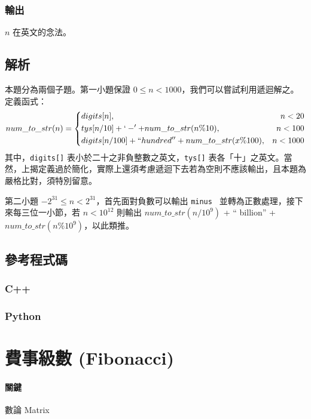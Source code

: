 \documentclass[a4paper,10pt]{article}
\begin{document}
\subsubsection{輸出}

$n$ 在英文的念法。

\subsection{解析}

本題分為兩個子題。第一小題保證 $0 \leq n < 1000$，我們可以嘗試利用遞迴解之。定義函式：
$$ num\_to\_str(n) = \left\{\begin{aligned}
& digits[n], & n < 20 \\
& tys[n / 10] + `-' + num\_to\_str(n \% 10), & n < 100 \\
& digits[n / 100] + `` hundred'' + num\_to\_str(x \% 100), & n < 1000 \\
\end{aligned}\right.$$
其中，\texttt{digits[]} 表小於二十之非負整數之英文，\texttt{tys[]} 表各「十」之英文。當然，上揭定義過於簡化，實際上還須考慮遞迴下去若為空則不應該輸出，且本題為嚴格比對，須特別留意。

第二小題 $-2^{31} \leq n < 2^{31}$，首先面對負數可以輸出 \texttt{minus } 並轉為正數處理，接下來每三位一小節，若 $n < 10^{12}$ 則輸出 $num\_to\_str(n / 10^9)$ + `` billion'' + $num\_to\_str(n \% 10^9)$，以此類推。

\subsection{參考程式碼}

\subsubsection{C++}



\subsubsection{Python}



\section{費事級數 (Fibonacci)}

\paragraph{關鍵} 數論 Matrix
\end{document}
